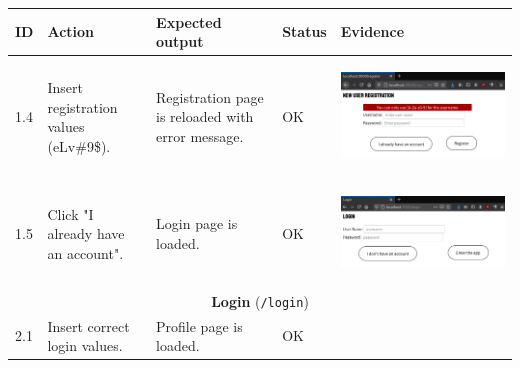 \documentclass[12pt,twoside,titlepage,a4paper]{article}
\theoremstyle{definicion}
\theoremstyle{lema}
\theoremstyle{teorema}
\theoremstyle{corolario}
\theoremstyle{ejemplo}
\theoremstyle{nota}
\begin{document}
\begin{table}[!h]
	\centering
	\begin{tabular}{|m{0.6cm}|m{2.9cm}|m{3.6cm}|m{1.1cm}|m{5.9cm}|}
		\hline
		\textbf{ID} & \textbf{Action} & \textbf{Expected output} & \textbf{Status} & \textbf{Evidence} \\
		\hline
		1.4 & Insert registration values (eLv\#9\$). & Registration page is reloaded with error message. & OK &
		\begin{center}\includegraphics[scale=0.3]{register4.png}\end{center} \\
		\hline
		1.5 & Click "I already have an account". & Login page is loaded. & OK &
		\begin{center}\includegraphics[scale=0.3]{register2-login1.png}\end{center} \\
		\hline
		\multicolumn{5}{|c|}{\textbf{Login} (\texttt{/login})} \\ 
		\hline
		2.1 & Insert correct login values. & Profile page is loaded. & OK &

\end{tabular}
\end{table}
\end{document}
